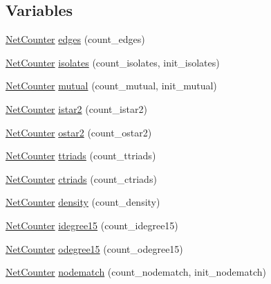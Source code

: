 \subsection*{Variables}
\begin{DoxyCompactItemize}
\item 
\hyperlink{namespacebarry_1_1counters_1_1network_a2d14cbc0a77bfba218df85a750bfeb84}{Net\+Counter} \hyperlink{namespacebarry_1_1counters_1_1network_a025eda0612c21b33ce59299b107845cb}{edges} (count\+\_\+edges)
\item 
\hyperlink{namespacebarry_1_1counters_1_1network_a2d14cbc0a77bfba218df85a750bfeb84}{Net\+Counter} \hyperlink{namespacebarry_1_1counters_1_1network_a9aecd717b6c7f12760b4c4ce08395844}{isolates} (count\+\_\+isolates, init\+\_\+isolates)
\item 
\hyperlink{namespacebarry_1_1counters_1_1network_a2d14cbc0a77bfba218df85a750bfeb84}{Net\+Counter} \hyperlink{namespacebarry_1_1counters_1_1network_a6df86b773f8b0ff358e8988122562a28}{mutual} (count\+\_\+mutual, init\+\_\+mutual)
\item 
\hyperlink{namespacebarry_1_1counters_1_1network_a2d14cbc0a77bfba218df85a750bfeb84}{Net\+Counter} \hyperlink{namespacebarry_1_1counters_1_1network_a61a7a588792249d68f3711e87bd53ad4}{istar2} (count\+\_\+istar2)
\item 
\hyperlink{namespacebarry_1_1counters_1_1network_a2d14cbc0a77bfba218df85a750bfeb84}{Net\+Counter} \hyperlink{namespacebarry_1_1counters_1_1network_abbf28b19669fd98aee3026360210e40c}{ostar2} (count\+\_\+ostar2)
\item 
\hyperlink{namespacebarry_1_1counters_1_1network_a2d14cbc0a77bfba218df85a750bfeb84}{Net\+Counter} \hyperlink{namespacebarry_1_1counters_1_1network_aab259a7692f59f9276f75914f50bddca}{ttriads} (count\+\_\+ttriads)
\item 
\hyperlink{namespacebarry_1_1counters_1_1network_a2d14cbc0a77bfba218df85a750bfeb84}{Net\+Counter} \hyperlink{namespacebarry_1_1counters_1_1network_a67940daab1e0101588a05d84d6f9ad22}{ctriads} (count\+\_\+ctriads)
\item 
\hyperlink{namespacebarry_1_1counters_1_1network_a2d14cbc0a77bfba218df85a750bfeb84}{Net\+Counter} \hyperlink{namespacebarry_1_1counters_1_1network_aa15d84663778df2b26161a2812cbd4c6}{density} (count\+\_\+density)
\item 
\hyperlink{namespacebarry_1_1counters_1_1network_a2d14cbc0a77bfba218df85a750bfeb84}{Net\+Counter} \hyperlink{namespacebarry_1_1counters_1_1network_ab0e6bdd119e291f67a6f94dd715391f5}{idegree15} (count\+\_\+idegree15)
\item 
\hyperlink{namespacebarry_1_1counters_1_1network_a2d14cbc0a77bfba218df85a750bfeb84}{Net\+Counter} \hyperlink{namespacebarry_1_1counters_1_1network_ac204cfc5dd18deb85d71dec056edfc16}{odegree15} (count\+\_\+odegree15)
\item 
\hyperlink{namespacebarry_1_1counters_1_1network_a2d14cbc0a77bfba218df85a750bfeb84}{Net\+Counter} \hyperlink{namespacebarry_1_1counters_1_1network_a2903bd8cf46b7c8b72d49c92dd52c8ae}{nodematch} (count\+\_\+nodematch, init\+\_\+nodematch)
\end{DoxyCompactItemize}


